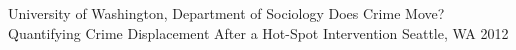 \begin{cventries}
  \cventry
    {University of Washington, Department of Sociology} %
    {Does Crime Move? Quantifying Crime Displacement After a Hot-Spot Intervention} %
    {Seattle, WA} %
    {2012} %
    {}
    


\end{cventries}




